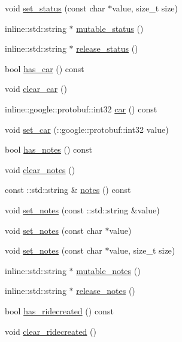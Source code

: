 \begin{DoxyCompactItemize}
\item 
void \hyperlink{classPatronInfo_a94686e2ab651c4a872bf7af4dccca17f}{set\-\_\-status} (const char $\ast$value, size\-\_\-t size)
\item 
inline\-::std\-::string $\ast$ \hyperlink{classPatronInfo_a480ba09985af90434836fd6ee86b8661}{mutable\-\_\-status} ()
\item 
inline\-::std\-::string $\ast$ \hyperlink{classPatronInfo_a41a7f5b0c94c2933f16b0b25bbce6776}{release\-\_\-status} ()
\item 
bool \hyperlink{classPatronInfo_afbd17d1c386dfce24e169e2ccfdd6ff8}{has\-\_\-car} () const 
\item 
void \hyperlink{classPatronInfo_aa4d3aad3b7c41b8c13e46af364f49f0c}{clear\-\_\-car} ()
\item 
inline\-::google\-::protobuf\-::int32 \hyperlink{classPatronInfo_a9da6ae42d19ec1f2e2cd884f4f79f4a2}{car} () const 
\item 
void \hyperlink{classPatronInfo_af8218cc02f0c4cafe361126e2b0f4f64}{set\-\_\-car} (\-::google\-::protobuf\-::int32 value)
\item 
bool \hyperlink{classPatronInfo_a8fc18302f8d85e701b70e97ed147817c}{has\-\_\-notes} () const 
\item 
void \hyperlink{classPatronInfo_a25b2d8425ba2210c08a8f80dae4a8852}{clear\-\_\-notes} ()
\item 
const \-::std\-::string \& \hyperlink{classPatronInfo_a5bbd9d4d23d7a2fa225ebbe7aa16410c}{notes} () const 
\item 
void \hyperlink{classPatronInfo_aae70d6686caaf137b6e1618f16af344b}{set\-\_\-notes} (const \-::std\-::string \&value)
\item 
void \hyperlink{classPatronInfo_a78693023d5b3fa99333c4492abcea7fc}{set\-\_\-notes} (const char $\ast$value)
\item 
void \hyperlink{classPatronInfo_a4cbc134658bb4bff53d5f1bb88e4bcee}{set\-\_\-notes} (const char $\ast$value, size\-\_\-t size)
\item 
inline\-::std\-::string $\ast$ \hyperlink{classPatronInfo_a5ea8f90626715ebc8bacab7d79d659b1}{mutable\-\_\-notes} ()
\item 
inline\-::std\-::string $\ast$ \hyperlink{classPatronInfo_ae57eac332b506bf27edd8279bb2fd196}{release\-\_\-notes} ()
\item 
bool \hyperlink{classPatronInfo_a916b37cd3e524e277dcb15dcec048ee8}{has\-\_\-ridecreated} () const 
\item 
void \hyperlink{classPatronInfo_a409eaf91f637b860e24df37cebacd457}{clear\-\_\-ridecreated} ()

\end{DoxyCompactItemize}
